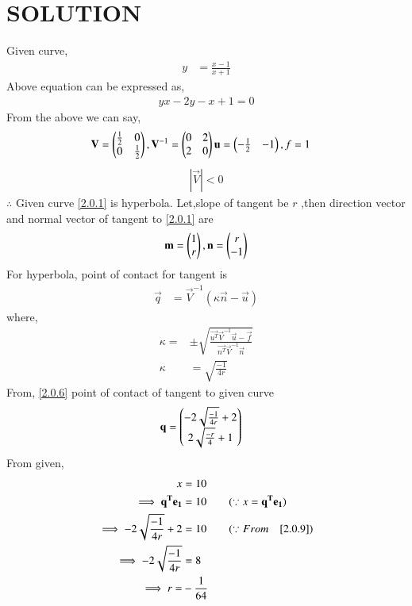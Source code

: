\documentclass[journal,12pt,twocolumn]{IEEEtran}
\begin{document}
\section{SOLUTION}
Given curve,
\begin{align}
y&=\frac{{x-1}}{{x+1}} \label{2.0.1}
\end{align}
Above equation can be expressed as,
\begin{align}
yx-2y-x+1 =0
\end{align}
From the above we can say,
\begin{align}
\vec{V}&=\myvec{\frac{1}{2} & 0 \\ 0 & \frac{1}{2}},\vec{V}^{-1}=\myvec{0&2\\2&0}\vec{u}=\myvec{-\frac{1}{2}&-1},
f =1
\end{align}
\begin{align}
 |\vec{V}| < 0
\end{align}
$\therefore $ Given curve \eqref{2.0.1} is hyperbola.
Let,slope of tangent be $r$ ,then direction vector and normal vector of tangent to \eqref{2.0.1} are
\begin{align}
    \vec{m}= \myvec{1\\r},\vec{n}=\myvec{r\\-1} \label{2.0.5}
\end{align}
For hyperbola, point of contact for tangent is
\begin{align}
\vec{q}&=\vec{V}^{-1}(\kappa\vec{n}-\vec{u})\label{2.0.6}
\end{align}
where,
\begin{align}
\kappa=&\pm \sqrt{\frac{\vec{u^T}\vec{V}^{-1}\vec{u}-\vec{f}}{\vec{n^T}\vec{V}^{-1}\vec{n}}}\\
\kappa&=\sqrt{\frac{-1}{4r}} \label{2.0.8}
\end{align}
From, \eqref{2.0.6} point of contact of tangent to given curve
\begin{align}
\vec{q} &= \myvec{-2\sqrt{\frac{-1}{4r}}+2\\2\sqrt{\frac{-r}{4}}+1}\label{2.0.9}
\end{align}
From given,
\begin{align}
x&=10\\
\implies \vec{q^T}\vec{e_1}&=10\quad \quad (\because x =\vec{q^T}\vec{e_1} )\\
\implies-2\sqrt{\frac{-1}{4r}}+2 &= 10\quad\quad(\because From \quad \eqref{2.0.9})\\
\implies -2\sqrt{\frac{-1}{4r}}&=8\\
\implies r=&-\frac{1}{64}
\end{align}
\end{document}
